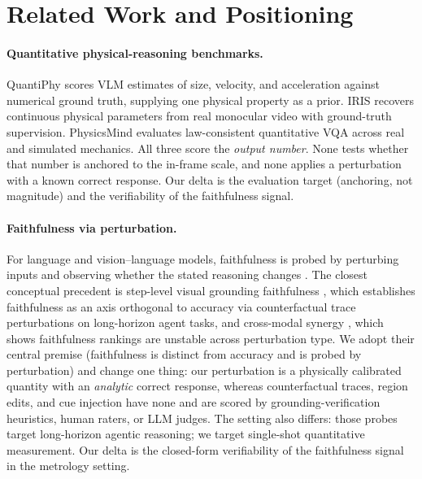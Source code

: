 \documentclass[11pt]{article}
\begin{document}
\section{Related Work and Positioning}
\label{sec:related}

\paragraph{Quantitative physical-reasoning benchmarks.}
QuantiPhy \citep{quantiphy2025} scores VLM estimates of size, velocity, and
acceleration against numerical ground truth, supplying one physical property as
a prior. IRIS \citep{iris2026} recovers continuous physical parameters from real
monocular video with ground-truth supervision. PhysicsMind \citep{physicsmind2026}
evaluates law-consistent quantitative VQA across real and simulated mechanics.
All three score the \emph{output number}. None tests whether that number is
anchored to the in-frame scale, and none applies a perturbation with a known
correct response. Our delta is the evaluation target (anchoring, not magnitude)
and the verifiability of the faithfulness signal.

\paragraph{Faithfulness via perturbation.}
For language and vision--language models, faithfulness is probed by perturbing
inputs and observing whether the stated reasoning changes
\citep{lanham2023faithfulness,turpin2023language,medfaith2025,rlvlm2026,visualthink2025}.
The closest conceptual precedent is step-level visual grounding faithfulness
\citep{stepground2026}, which establishes faithfulness as an axis orthogonal to
accuracy via counterfactual trace perturbations on long-horizon agent tasks, and
cross-modal synergy \citep{crossmodal2026}, which shows faithfulness rankings are
unstable across perturbation type. We adopt their central premise (faithfulness
is distinct from accuracy and is probed by perturbation) and change one thing:
our perturbation is a physically calibrated quantity with an \emph{analytic}
correct response, whereas counterfactual traces, region edits, and cue injection
have none and are scored by grounding-verification heuristics, human raters, or
LLM judges. The setting also differs: those probes target long-horizon agentic
reasoning; we target single-shot quantitative measurement. Our delta is the
closed-form verifiability of the faithfulness signal in the metrology setting.
\end{document}
